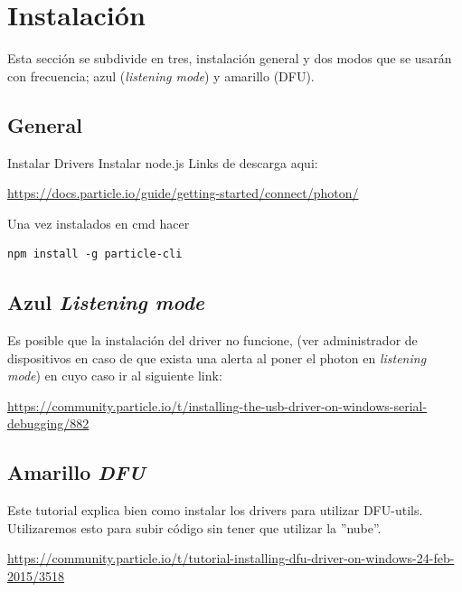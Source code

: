 \documentclass[12pt]{article}
\begin{document}
\section{Instalación}
Esta sección se subdivide en tres, instalación general y  dos modos que se usarán con frecuencia; azul (\textit{listening mode}) y amarillo (DFU). 
\subsection{General}

Instalar Drivers
Instalar node.js
Links de descarga aqui:

\medskip

\hyperref[https://docs.particle.io/guide/getting-started/connect/photon/
]{https://docs.particle.io/guide/getting-started/connect/photon/
}


\medskip
Una vez instalados en cmd hacer
\medskip
\begin{verbatim}
npm install -g particle-cli
\end{verbatim}

\subsection{Azul \textit{Listening mode}}

Es posible que la instalación del driver no funcione, (ver administrador de dispositivos en caso de que exista una alerta al poner el photon en \textit{listening mode}) en cuyo caso ir al siguiente link:

\medskip

\hyperref[https://community.particle.io/t/installing-the-usb-driver-on-windows-serial-debugging/882
]{https://community.particle.io/t/installing-the-usb-driver-on-windows-serial-debugging/882
}




\subsection{Amarillo \textit{DFU}}

Este tutorial explica bien como instalar los drivers para utilizar DFU-utils. Utilizaremos esto para subir código sin tener que utilizar la ''nube''.

\medskip

\hyperref[https://community.particle.io/t/tutorial-installing-dfu-driver-on-windows-24-feb-2015/3518
]{https://community.particle.io/t/tutorial-installing-dfu-driver-on-windows-24-feb-2015/3518
}
\end{document}
